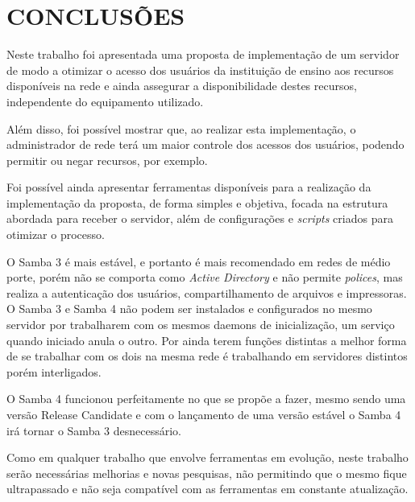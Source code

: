 \chapter{CONCLUSÕES}

Neste trabalho foi apresentada uma proposta de implementação de um servidor de modo a otimizar o acesso dos usuários da instituição de ensino aos recursos disponíveis na rede e ainda assegurar a disponibilidade destes recursos, independente do equipamento utilizado.

Além disso, foi possível mostrar que, ao realizar esta implementação, o administrador de rede terá um maior controle dos acessos dos usuários, podendo permitir ou negar recursos, por exemplo.

Foi possível ainda apresentar ferramentas disponíveis para a realização da implementação da proposta, de forma simples e objetiva, focada na estrutura abordada para receber o servidor, além de configurações e \textit{scripts} criados para otimizar o processo.

O Samba 3 é mais estável, e portanto é mais recomendado em redes de médio porte, porém não se comporta como \textit{Active Directory} e não permite \textit{polices}, mas realiza a autenticação dos usuários, compartilhamento de arquivos e impressoras.
O Samba 3 e Samba 4 não podem ser instalados e configurados no mesmo servidor por trabalharem com os mesmos daemons de inicialização, um serviço quando iniciado anula o outro.	
Por ainda terem funções distintas a melhor forma de se trabalhar com os dois na mesma rede é trabalhando em servidores distintos porém interligados.

O Samba 4 funcionou perfeitamente no que se propõe a fazer, mesmo sendo uma versão Release Candidate e com o lançamento de uma versão estável o Samba 4 irá tornar o Samba 3 desnecessário.

Como em qualquer trabalho que envolve ferramentas em evolução, neste trabalho serão necessárias melhorias e novas pesquisas, não permitindo que o mesmo fique ultrapassado e não seja compatível com as ferramentas em constante atualização.




